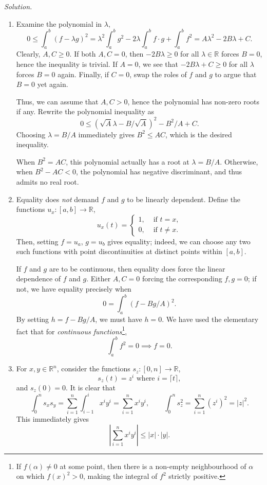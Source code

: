 \documentclass[11pt]{report}
\newcommand{\R}{\mathbb{R}}
\newcommand{\solution}{\noindent\textit{Solution.} }
\begin{document}
    \solution 
    \begin{enumerate}
        \item Examine the polynomial in $\lambda$, \[
            0 \leq \int_a^b (f - \lambda g)^2 = \lambda^2 \int_a^b g^2 - 2\lambda
            \int_a^b f\cdot g + \int_a^b f^2 = A\lambda^2 - 2B\lambda + C.
        \] Clearly, $A, C \geq 0$. If both $A, C = 0$, then $-2B\lambda \geq 0$ for
        all $\lambda \in \R$ forces $B = 0$, hence the inequality is trivial. If $A =
        0$, we see that $-2B\lambda + C \geq 0$ for all $\lambda$ forces $B = 0$
        again. Finally, if $C = 0$, swap the roles of $f$ and $g$ to argue that $B =
        0$ yet again.

        Thus, we can assume that $A, C > 0$, hence the polynomial has non-zero roots
        if any. Rewrite the polynomial inequality as \[
            0 \leq (\sqrt{A}\lambda - B / \sqrt{A})^2 - B^2 / A + C.
        \] Choosing $\lambda = B / A$ immediately gives $B^2 \leq AC$, which is the
        desired inequality.

        When $B^2 = AC$, this polynomial actually has a root at $\lambda = B / A$.
        Otherwise, when $B^2 - AC < 0$, the polynomial has negative discriminant, and
        thus admits no real root.

        \item Equality does \emph{not} demand $f$ and $g$ to be linearly dependent.
        Define the functions $u_x\colon [a, b] \to \R$, \[
            u_x(t) = \begin{cases}
                1, &\text{ if } t = x, \\
                0, &\text{ if } t \neq x.
            \end{cases}
        \] Then, setting $f = u_a$, $g = u_b$ gives equality; indeed, we can choose
        any two such functions with point discontinuities at distinct points within
        $[a, b]$.

        If $f$ and $g$ are to be continuous, then equality does force the linear
        dependence of $f$ and $g$. Either $A, C = 0$ forcing the corresponding $f, g
        = 0$; if not, we have equality precisely when \[
            0 = \int_a^b (f - Bg / A)^2.
        \] By setting $h = f - Bg / A$, we must have $h = 0$. We have used the
        elementary fact that for \emph{continuous functions}\footnote{If $f(\alpha)
        \neq 0$ at some point, then there is a non-empty neighbourhood of $\alpha$ on
        which $f(x)^2 > 0$, making the integral of $f^2$ strictly positive.}, \[
            \int_a^b f^2 = 0 \implies f = 0.
        \] 

        \item For $x, y \in \R^n$, consider the functions $s_z\colon [0, n] \to \R$,
        \[
            s_z(t) = z^i \text { where } i = \lceil t\rceil,
        \] and $s_z(0) = 0$. It is clear that \[
            \int_0^n s_x s_y = \sum_{i = 1}^n \int_{i - 1}^i x^i y^i = \sum_{i = 1}^n
            x^iy^i, \qquad
            \int_0^n s_z^2 = \sum_{i = 1}^n (z^i)^2 = |z|^2.
        \] This immediately gives \[
            |\sum_{i = 1}^n x^i y^i| \leq |x| \cdot |y|.
        \] 
    \end{enumerate}
\end{document}
